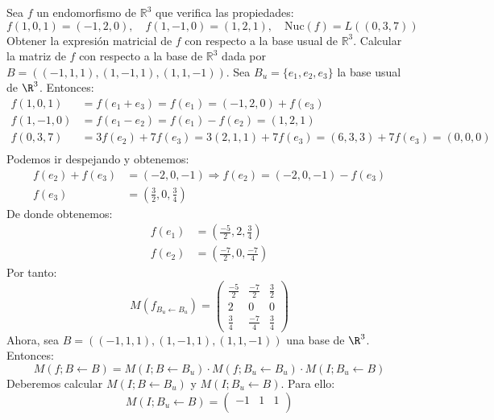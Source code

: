\begin{ejercicio}
	Sea \( f \) un endomorfismo de \( \mathbb{R}^3 \) que verifica las propiedades:
	\[ f(1,0,1) = (-1,2,0), \quad f(1,-1,0) = (1,2,1), \quad \text{Nuc}(f) = L((0,3,7)) \]
	Obtener la expresión matricial de \( f \) con respecto a la base usual de \( \mathbb{R}^3 \). Calcular la matriz de \( f \) con respecto a la base de \( \mathbb{R}^3 \) dada por \( B = ((-1,1,1), (1,-1,1), (1,1,-1)) \).
	Sea $B_u = \{e_1,e_2,e_3\}$ la base usual de $\R^3$. Entonces:
	\begin{align*}
		f(1,0,1)  & = f(e_1+e_3) = f(e_1) = (-1,2,0)+f(e_3)                          \\
		f(1,-1,0) & = f(e_1-e_2) = f(e_1)-f(e_2) = (1,2,1)                           \\
		f(0,3,7)  & = 3f(e_2)+7f(e_3) = 3(2,1,1)+7f(e_3) = (6,3,3)+7f(e_3) = (0,0,0) \\
	\end{align*}
	Podemos ir despejando y obtenemos:
	\begin{align*}
		f(e_2)+f(e_3) & = (-2,0,-1) \Rightarrow f(e_2) = (-2,0,-1)-f(e_3) \\
		f(e_3)        & = \left(\frac{3}{2},0,\frac{3}{4}\right)
	\end{align*}
	De donde obtenemos:
	\begin{align*}
		f(e_1) & = \left(\frac{-5}{2},2,\frac{3}{4}\right)  \\
		f(e_2) & = \left(\frac{-7}{2},0,\frac{-7}{4}\right)
	\end{align*}
	Por tanto:
	\begin{equation*}
		M(f_{B_u \leftarrow B_u}) = \begin{pmatrix}
			\frac{-5}{2} & \frac{-7}{2} & \frac{3}{2} \\
			2            & 0            & 0           \\
			\frac{3}{4}  & \frac{-7}{4} & \frac{3}{4}
		\end{pmatrix}
	\end{equation*}
	Ahora, sea $B = ((-1,1,1), (1,-1,1), (1,1,-1))$ una base de $\R^3$. Entonces:
	\begin{equation*}
		M(f;B \leftarrow B) = M(I;B \leftarrow B_u) \cdot M(f;B_u \leftarrow B_u) \cdot M(I;B_u \leftarrow B)
	\end{equation*}
	Deberemos calcular $M(I;B \leftarrow B_u)$ y $M(I;B_u \leftarrow B)$. Para ello:
	\begin{equation*}
		M(I;B_u \leftarrow B) = \begin{pmatrix}
			-1 & 1  & 1  \\

\end{pmatrix}
\end{equation*}
\end{ejercicio}
